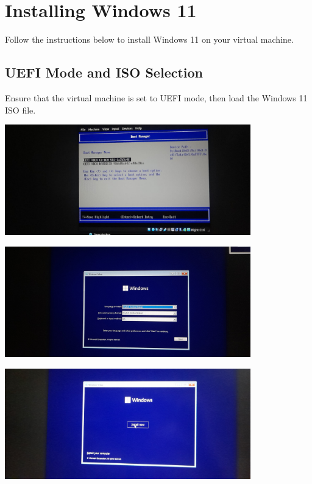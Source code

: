 \documentclass[a4paper]{article}
\begin{document}
\section{Installing Windows 11}
Follow the instructions below to install Windows 11 on your virtual machine.

\subsection{UEFI Mode and ISO Selection}
Ensure that the virtual machine is set to UEFI mode, then load the Windows 11 ISO file.

\begin{center}
    \includegraphics[width=0.8\textwidth]{8.jpeg} %
\end{center}
\begin{center}
    \includegraphics[width=0.8\textwidth]{9.jpeg} %
\end{center}
\begin{center}
    \includegraphics[width=0.8\textwidth]{10.jpeg} %
\end{center}
\end{document}
